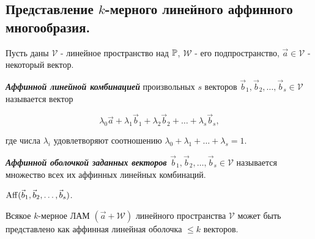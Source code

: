 \subsection{
    Представление $k$-мерного линейного аффинного многообразия.
}

Пусть даны $\mathcal{V}$ - линейное пространство над $\mathbb{P}$, $\mathcal{W}$ - его подпространство, $\vec{a} \in \mathcal{V}$ - некоторый вектор.

\begin{definition}
    \textbf{\textit{Аффинной линейной комбинацией}} произвольных $s$ векторов $\vec{b}_1, \vec{b}_2, \ldots, \vec{b}_s \in \mathcal{V}$ называется вектор

    $$\lambda_0\vec{a} + \lambda_1\vec{b}_1 + \lambda_2\vec{b}_2 +  \ldots + \lambda_s\vec{b}_s,$$

    где числа $\lambda_i$ удовлетворяют соотношению $\lambda_0 + \lambda_1 + \ldots + \lambda_s = 1$.
\end{definition}

\begin{definition}
    \textbf{\textit{Аффинной оболочкой заданных векторов $\vec{b}_1, \vec{b}_2, \ldots, \vec{b}_s \in \mathcal{V}$}} называется множество всех их аффинных линейных комбинаций.
\end{definition}

\begin{designation}
    $\operatorname{\mathop{\mathrm{Aff}}}(\vec{b}_1, \vec{b}_2, \ldots, \vec{b}_s)$.
\end{designation}

\begin{theorem}
    Всякое $k$-мерное ЛАМ $(\vec{a} + \mathcal{W})$ линейного пространства $\mathcal{V}$ может быть представлено как аффинная линейная оболочка $\leq k$ векторов.
\end{theorem}

